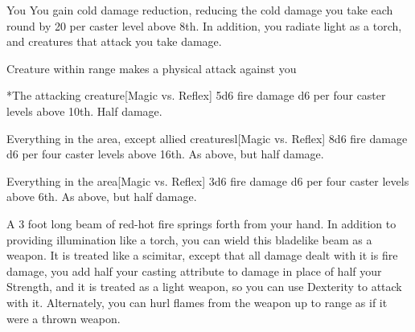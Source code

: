 \spelldur{\durshort \dismissable}
\begin{spelltarget}{You}
    \spelleffect You gain cold damage reduction, reducing the cold damage you take each round by 20  per caster level above 8th. In addition, you radiate light as a torch, and creatures that attack you take damage.
\end{spelltarget}
\begin{spelltrigger}{Creature within \rngclose range makes a physical attack against you}
    \begin{spelltarget}*{The attacking creature}[Magic vs. Reflex]
        \spellsuccess 5d6 fire damage \add d6 per four caster levels above 10th.
        \spellfailure Half damage.
    \end{spelltarget}
\end{spelltrigger}

\begin{spelltargets}{Everything in the area, except allied creatures}l[Magic vs. Reflex]
    \spellsuccess 8d6 fire damage \add d6 per four caster levels above 16th.
    \spellfailure As above, but half damage.
\end{spelltargets}

\begin{spelltargets}{Everything in the area}[Magic vs. Reflex]
    \spellsuccess 3d6 fire damage \add d6 per four caster levels above 6th.
    \spellfailure As above, but half damage.
\end{spelltargets}
\spellnotes \destructivespellnotes

\firespellnotes

\spelldur{\durlong \dismissable}
\spelleffect A 3 foot long beam of red-hot fire springs forth from your hand. In addition to providing illumination like a torch, you can wield this bladelike beam as a weapon. It is treated like a scimitar, except that all damage dealt with it is fire damage, you add half your casting attribute to damage in place of half your Strength, and it is treated as a light weapon, so you can use Dexterity to attack with it. Alternately, you can hurl flames from the weapon up to \rngmed range as if it were a thrown weapon.
\spellnotes \firespellnotes


